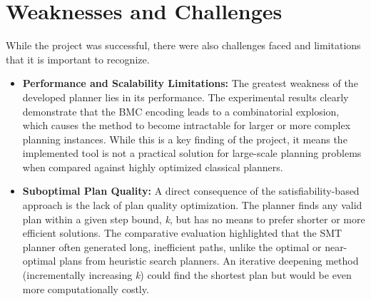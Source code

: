 \documentclass[12pt, a4paper, oneside]{report} %
\begin{document}
\section{Weaknesses and Challenges}
While the project was successful, there were also challenges faced and limitations that it is important to recognize.
\begin{itemize}
    \item \textbf{Performance and Scalability Limitations:} The greatest weakness of the developed planner lies in its performance. The experimental results clearly demonstrate that the BMC encoding leads to a combinatorial explosion, which causes the method to become intractable for larger or more complex planning instances. While this is a key finding of the project, it means the implemented tool is not a practical solution for large-scale planning problems when compared against highly optimized classical planners.
    \item \textbf{Suboptimal Plan Quality:} A direct consequence of the satisfiability-based approach is the lack of plan quality optimization. The planner finds any valid plan within a given step bound, \textit{k}, but has no means to prefer shorter or more efficient solutions. The comparative evaluation highlighted that the SMT planner often generated long, inefficient paths, unlike the optimal or near-optimal plans from heuristic search planners. An iterative deepening method (incrementally increasing \textit{k}) could find the shortest plan but would be even more computationally costly.
\end{itemize}
\end{document}
